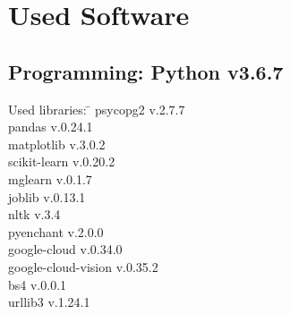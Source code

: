 \chapter*{Used Software}

\section*{Programming: Python v3.6.7}
\begin{tabbing}
 Used libraries:
 \hspace*{1.6cm}  \= \kill
 psycopg2 \> v.2.7.7 \\
 pandas \> v.0.24.1 \\
 matplotlib \> v.3.0.2 \\
 scikit-learn \> v.0.20.2 \\
 mglearn \> v.0.1.7 \\
 joblib \> v.0.13.1 \\
 nltk \> v.3.4 \\
 pyenchant \> v.2.0.0 \\
 google-cloud \> v.0.34.0 \\
 google-cloud-vision \> v.0.35.2 \\
 bs4 \> v.0.0.1 \\
 urllib3 \> v.1.24.1
\end{tabbing}

